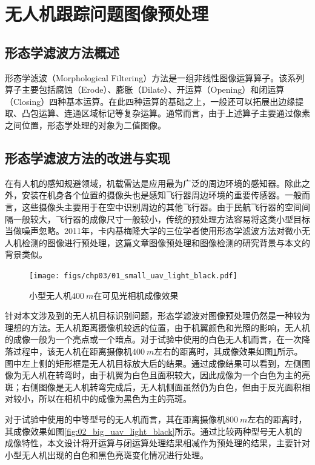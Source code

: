 \section{无人机跟踪问题图像预处理}
\subsection{形态学滤波方法概述}
形态学滤波（Morphological Filtering）方法是一组非线性图像运算算子。该系列算子主要包括腐蚀（Erode）、膨胀（Dilate）、开运算（Opening）和闭运算（Closing）四种基本运算。在此四种运算的基础之上，一般还可以拓展出边缘提取、凸包运算、连通区域标记等复杂运算。通常而言，由于上述算子主要通过像素之间位置，形态学处理的对象为二值图像。
\subsection{形态学滤波方法的改进与实现}
在有人机的感知规避领域，机载雷达是应用最为广泛的周边环境的感知器。除此之外，安装在机身各个位置的摄像头也是感知飞行器周边环境的重要传感器。一般而言，这些摄像头主要用于在空中识别周边的其他飞行器。由于民航飞行器的空间间隔一般较大，飞行器的成像尺寸一般较小，传统的预处理方法容易将这类小型目标当做噪声忽略。2011年，卡内基梅隆大学的三位学者使用形态学滤波方法对微小无人机检测的图像进行预处理\cite{dey2011cascaded}，这篇文章图像预处理和图像检测的研究背景与本文的背景类似。
\begin{figure}[ht]   
	\centering
	\texttt{[image: figs/chp03/01\_small\_uav\_light\_black.pdf]}
	\caption{小型无人机$400\ m$在可见光相机成像效果}
	\label{fig:01_small_uav_light_black}
\end{figure}

针对本文涉及到的无人机目标识别问题，形态学滤波对图像预处理仍然是一种较为理想的方法。无人机距离摄像机较远的位置，由于机翼颜色和光照的影响，无人机的成像一般为一个亮点或一个暗点。对于试验中使用的白色无人机而言，在一次降落过程中，该无人机在距离摄像机$400\ m$左右的距离时，其成像效果如图\ref{fig:01_small_uav_light_black}所示。图中左上侧的矩形框是无人机目标放大后的结果。通过成像结果可以看到，左侧图像为无人机在转弯时，由于机翼为白色且面积较大，因此成像为一个白色为主的亮斑；右侧图像是无人机转弯完成后，无人机侧面虽然仍为白色，但由于反光面积相对较小，所以在相机中的成像为黑色为主的亮斑。


对于试验中使用的中等型号的无人机而言，其在距离摄像机$800\ m$左右的距离时，其成像效果如图\ref{fig:02_big_uav_light_black}所示。通过比较两种型号无人机的成像特性，本文设计将开运算与闭运算处理结果相减作为预处理的结果，主要针对小型无人机出现的白色和黑色亮斑变化情况进行处理。

